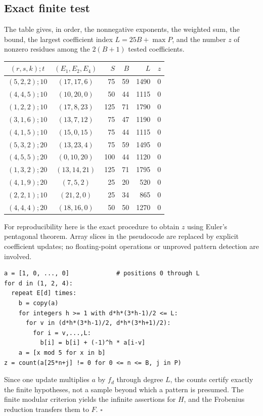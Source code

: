 \documentclass[11pt,a4paper]{article}
\begin{document}
\subsection{Exact finite test}
The table gives, in order, the nonnegative exponents, the weighted sum, the bound, the largest coefficient index $L=25B+\max P$, and the number $z$ of nonzero residues among the $2(B+1)$ tested coefficients.
\begin{center}
\begin{tabular}{ccrrrr}
\toprule
$(r,s,k);t$ & $(E_1,E_2,E_4)$ & $S$& $B$& $L$&$z$\\ \midrule
$(5,2,2);10$ & $(17,17,6)$ &75&59&1490&0\\
$(4,4,5);10$ & $(10,20,0)$ &50&44&1115&0\\
$(1,2,2);10$ & $(17,8,23)$ &125&71&1790&0\\
$(3,1,6);10$ & $(13,7,12)$ &75&47&1190&0\\
$(4,1,5);10$ & $(15,0,15)$ &75&44&1115&0\\
$(5,3,2);20$ & $(13,23,4)$ &75&59&1495&0\\
$(4,5,5);20$ & $(0,10,20)$ &100&44&1120&0\\
$(1,3,2);20$ & $(13,14,21)$ &125&71&1795&0\\
$(4,1,9);20$ & $(7,5,2)$ &25&20&520&0\\ \midrule
$(2,2,1);10$ & $(21,2,0)$ &25&34&865&0\\
$(4,4,4);20$ & $(18,16,0)$ &50&50&1270&0\\ \bottomrule
\end{tabular}
\end{center}
For reproducibility here is the exact procedure to obtain $z$ using Euler's pentagonal theorem. Array slices in the pseudocode are replaced by explicit coefficient updates; no floating-point operations or unproved pattern detection are involved.
\begin{Verbatim}[fontsize=\footnotesize,breaklines,breakanywhere]
a = [1, 0, ..., 0]             # positions 0 through L
for d in (1, 2, 4):
  repeat E[d] times:
    b = copy(a)
    for integers h >= 1 with d*h*(3*h-1)/2 <= L:
      for v in (d*h*(3*h-1)/2, d*h*(3*h+1)/2):
        for i = v,...,L:
          b[i] = b[i] + (-1)^h * a[i-v]
    a = [x mod 5 for x in b]
z = count(a[25*n+j] != 0 for 0 <= n <= B, j in P)
\end{Verbatim}
Since one update multiplies $a$ by $f_d$ through degree $L$, the counts certify exactly the finite hypotheses, not a sample beyond which a pattern is presumed. The finite modular criterion yields the infinite assertions for $H$, and the Frobenius reduction transfers them to $F$. \hfill$\square$
\endgroup
\end{document}
